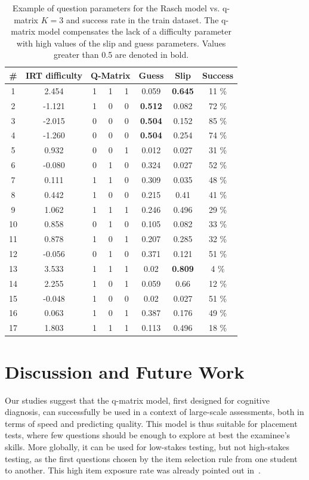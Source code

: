 \documentclass{sig-alternate}
\begin{document}
\begin{table}
\small\centering\begin{tabular}{c|c|ccccc|c}
\# & IRT difficulty & 	\multicolumn{3}{c}{Q-Matrix} & Guess & Slip & Success\\
\hline
1 & 2.454 & 	1 & 1 & 1 & 0.059 & \textbf{0.645} & 11 \% \\
2 & -1.121 & 	1 & 0 & 0 & \textbf{0.512} & 0.082 & 72 \% \\
3 & -2.015 & 	0 & 0 & 0 & \textbf{0.504} & 0.152 & 85 \% \\
4 & -1.260 & 	0 & 0 & 0 & \textbf{0.504} & 0.254 & 74 \% \\
5 & 0.932 & 	0 & 0 & 1 & 0.012 & 0.027 & 31 \% \\
6 & -0.080 & 	0 & 1 & 0 & 0.324 & 0.027 & 52 \% \\
7 & 0.111 & 	1 & 1 & 0 & 0.309 & 0.035 & 48 \% \\
8 & 0.442 & 	1 & 0 & 0 & 0.215 & 0.41 & 41 \% \\
9 & 1.062 & 	1 & 1 & 1 & 0.246 & 0.496 & 29 \% \\
10 & 0.858 & 	0 & 1 & 0 & 0.105 & 0.082 & 33 \% \\
11 & 0.878 & 	1 & 0 & 1 & 0.207 & 0.285 & 32 \% \\
12 & -0.056 & 	0 & 1 & 0 & 0.371 & 0.121 & 51 \% \\
13 & 3.533 & 	1 & 1 & 1 & 0.02 & \textbf{0.809} & 4 \% \\
14 & 2.255 & 	1 & 0 & 1 & 0.059 & 0.66 & 12 \% \\
15 & -0.048 & 	1 & 0 & 0 & 0.02 & 0.027 & 51 \% \\
16 & 0.063 & 	1 & 0 & 1 & 0.387 & 0.176 & 49 \% \\
17 & 1.803 & 	1 & 1 & 1 & 0.113 & 0.496 & 18 \%
\end{tabular}
\caption{Example of question parameters for the Rasch model vs. q-matrix $K = 3$ and success rate in the train dataset. The q-matrix model compensates the lack of a difficulty parameter with high values of the slip and guess parameters. Values greater than 0.5 are denoted in bold.}
\label{tab:example}
\end{table}

\section{Discussion and Future Work}

Our studies suggest that the q-matrix model, first designed for cognitive diagnosis, can successfully be used in a context of large-scale assessments, both in terms of speed and predicting quality. This model is thus suitable for placement tests, where few questions should be enough to explore at best the examinee's skills. More globally, it can be used for low-stakes testing, but not high-stakes testing, as the first questions chosen by the item selection rule from one student to another. This high item exposure rate was already pointed out in~\cite{Cheng2009}.
\end{document}
